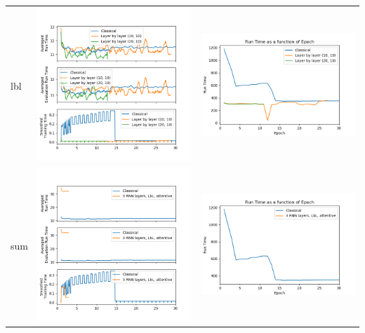 \begin{longtable}[]{@{}lll@{}}
lbl & \includegraphics[width=.45\textwidth]{parts/appendix/reports-gmsnn/docs_esteban-latex/test_reports/2018-06-27/lbl_time.png} &
 \includegraphics[width=.45\textwidth]{parts/appendix/reports-gmsnn/docs_esteban-latex/test_reports/2018-06-27/lbl_epoch.png} \tabularnewline

sum & \includegraphics[width=.45\textwidth]{parts/appendix/reports-gmsnn/docs_esteban-latex/test_reports/2018-06-27/sum_time.png} &
 \includegraphics[width=.45\textwidth]{parts/appendix/reports-gmsnn/docs_esteban-latex/test_reports/2018-06-27/sum_epoch.png} \tabularnewline
\hline
\end{longtable}

